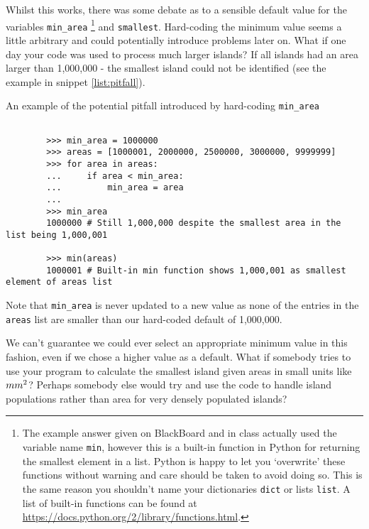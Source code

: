 \documentclass[a4paper]{article}
\begin{document}
Whilst this works, there was some debate as to a sensible default value for the
variables \texttt{min\_area} \footnote{The example answer given on BlackBoard and
in class actually used the variable name \texttt{min}, however this is a
built-in function in Python for returning the smallest element in a list. Python
is happy to let you `overwrite' these functions without warning and care should be
taken to avoid doing so. This is the same reason you shouldn't name your
dictionaries \texttt{dict} or lists \texttt{list}. A list of built-in functions can
be found at {\href{https://docs.python.org/2/library/functions.html}{https://docs.python.org/2/library/functions.html}}.}
and \texttt{smallest}. Hard-coding the minimum value seems
a little arbitrary and could potentially introduce problems later on. What if
one day your code was used to process much larger islands? If all islands had
an area larger than 1,000,000 - the smallest island could not be identified (see
the example in snippet \ref{list:pitfall}).

\begin{listing}[H]
    \caption[]{An example of the potential pitfall introduced by hard-coding \texttt{min\_area}}
    \label{list:pitfall}
    \begin{verbatim}

        >>> min_area = 1000000
        >>> areas = [1000001, 2000000, 2500000, 3000000, 9999999]
        >>> for area in areas:
        ...     if area < min_area:
        ...         min_area = area
        ...
        >>> min_area
        1000000 # Still 1,000,000 despite the smallest area in the list being 1,000,001

        >>> min(areas)
        1000001 # Built-in min function shows 1,000,001 as smallest element of areas list

    \end{verbatim}
\end{listing}

Note that \texttt{min\_area} is never updated to a new value as none of the entries in
the \texttt{areas} list are smaller than our hard-coded default of 1,000,000.

We can't guarantee we could ever select an appropriate minimum value in this fashion,
even if we chose a higher value as a default. What if somebody tries
to use your program to calculate the smallest island given areas in small units
like $mm\textsuperscript{2}$? Perhaps somebody else would try and use the code
to handle island populations rather than area for very densely populated islands?
\end{document}
